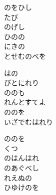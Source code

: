 \documentclass[10pt,b5j]{tarticle} %
\begin{document}
\begin{enumerate}
\begin{minipage}[c]{\blocksize}
        \vspace{\linespace}
        \item
        のをひし\\
        たび\\
        のげし\\
        ひのの\\
        にきの\\
        とせむのべを
        
        \vspace{\linespace}
        \item
        はの\\
        びとにれり\\
        ののも\\
        れんとすてよ\\
        ののを\\
        いざでむはれり
        
        \vspace{\linespace}
        \item
        ののを\\
        くつ\\
        のはんはれ\\
        のあぐべし\\
        れえぬの\\
        ひゆけのを
    
    \end{minipage}
\end{enumerate} %
\end{document}
